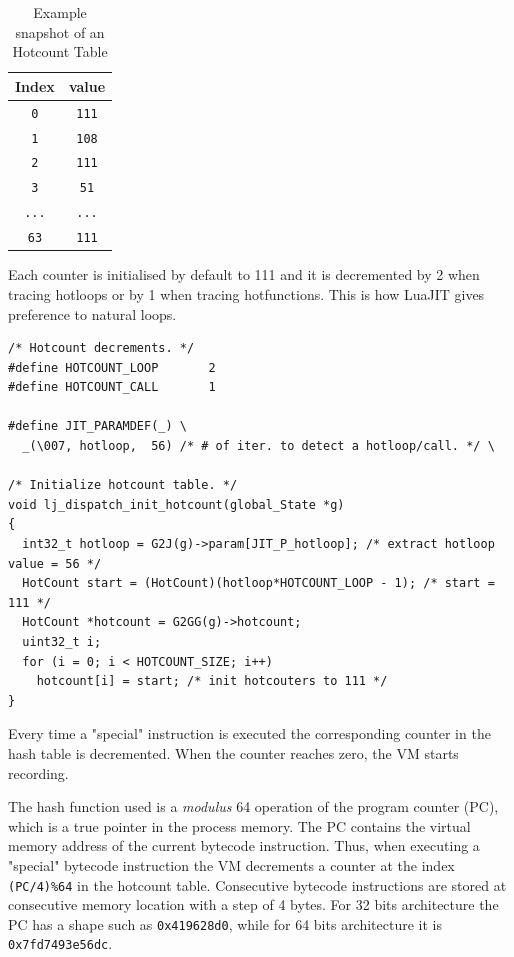 \begin{table}[H]
    \centering
    \begin{tabular}{|c|c|}
        \hline
        Index & value \\
        \hline
        \texttt{0} & \texttt{111} \\
        \texttt{1} & \texttt{108} \\ 
        \texttt{2} & \texttt{111} \\
        \texttt{3} & \texttt{51} \\
        \texttt{...} & \texttt{...} \\
        \texttt{63} & \texttt{111} \\
        \hline
    \end{tabular}
    \caption{Example snapshot of an Hotcount Table}
    \label{tab:my_label}
\end{table}

\noindent
Each counter is initialised by default to 111 and it is decremented by 2 when tracing hotloops or by 1 when tracing hotfunctions. This is how LuaJIT gives preference to natural loops.

\begin{lstlisting}[style=CStyle, caption=\texttt{lj\_dispatch.[c,h], lj\_jit.h}]
/* Hotcount decrements. */
#define HOTCOUNT_LOOP		2
#define HOTCOUNT_CALL		1

#define JIT_PARAMDEF(_) \
  _(\007, hotloop,	56)	/* # of iter. to detect a hotloop/call. */ \

/* Initialize hotcount table. */
void lj_dispatch_init_hotcount(global_State *g)
{
  int32_t hotloop = G2J(g)->param[JIT_P_hotloop]; /* extract hotloop value = 56 */
  HotCount start = (HotCount)(hotloop*HOTCOUNT_LOOP - 1); /* start = 111 */
  HotCount *hotcount = G2GG(g)->hotcount;
  uint32_t i;
  for (i = 0; i < HOTCOUNT_SIZE; i++)
    hotcount[i] = start; /* init hotcouters to 111 */
}
\end{lstlisting}

\noindent
Every time a "special" instruction is executed the corresponding counter in the hash table is decremented. When the counter reaches zero, the VM starts recording. 

The hash function used is a  \textit{modulus} 64 operation of the program counter (PC), which is a true pointer in the process memory. The PC contains the virtual memory address of the current bytecode instruction. Thus, when executing a "special" bytecode instruction the VM decrements a counter at the index \texttt{(PC/4)\%64} in the hotcount table. Consecutive bytecode instructions are stored at consecutive memory location with a step of 4 bytes. For 32 bits architecture the PC has a shape such as \texttt{0x419628d0}, while for 64 bits architecture it is \texttt{0x7fd7493e56dc}.

